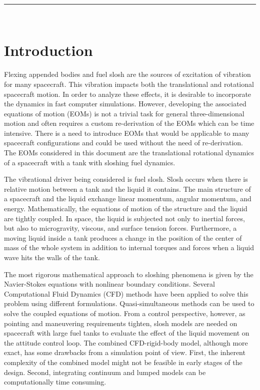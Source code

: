 \documentclass[]{BasiliskReportMemo}
\begin{document}
\makeCover
\newpage
\setcounter{page}{1}
\pagestyle{fancy}

\tableofcontents %
~\\ \hrule ~\\ %
\section{Introduction}

	Flexing appended bodies and fuel slosh are the sources of excitation of vibration for many spacecraft. This vibration impacts both the translational and rotational spacecraft motion. In order to analyze these effects, it is desirable to incorporate the dynamics in fast computer simulations. However, developing the associated equations of motion (EOMs) is not a trivial task for general three-dimensional motion and often requires a custom re-derivation of the EOMs which can be time intensive. There is a need to introduce EOMs that would be applicable to many spacecraft configurations and could be used without the need of re-derivation. The EOMs considered in this document are the translational rotational dynamics of a spacecraft with a tank with sloshing fuel dynamics. 
	
	The vibrational driver being considered is fuel slosh. Slosh occurs when there is relative motion between a tank and the liquid it contains. The main structure of a spacecraft and the liquid exchange linear momentum, angular momentum, and energy. Mathematically, the equations of motion of the structure and the liquid are tightly coupled. In space, the liquid is subjected not only to inertial forces, but also to microgravity, viscous, and surface tension forces. Furthermore, a moving liquid inside a tank produces a change in the position of the center of mass of the whole system in addition to internal torques and forces when a liquid wave hits the walls of the tank.
	
	The most rigorous mathematical approach to sloshing phenomena is given by the Navier-Stokes equations with nonlinear boundary conditions. Several Computational Fluid Dynamics (CFD) methods have been applied to solve this problem using different formulations. Quasi-simultaneous methods can be used to solve the coupled equations of motion. From a control perspective, however, as pointing and maneuvering requirements tighten, slosh models are needed on spacecraft with large fuel tanks to evaluate the effect of the liquid movement on the attitude control loop. The combined CFD-rigid-body model, although more exact, has some drawbacks from a simulation point of view. First, the inherent complexity of the combined model might not be feasible in early stages of the design. Second, integrating continuum and lumped models can be computationally time consuming.
	
\end{document}
